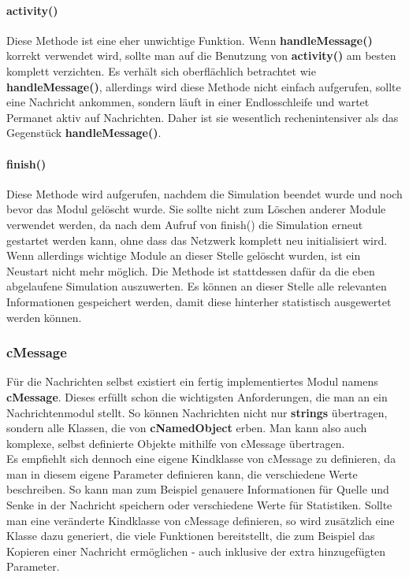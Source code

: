 \paragraph{activity()}

Diese Methode ist eine eher unwichtige Funktion. Wenn \textbf{handleMessage()} korrekt verwendet wird, sollte man auf die Benutzung von \textbf{activity()} am besten komplett verzichten. Es verhält sich oberflächlich betrachtet wie \textbf{handleMessage()}, allerdings wird diese Methode nicht einfach aufgerufen, sollte eine Nachricht ankommen, sondern läuft in einer Endlosschleife und wartet Permanet aktiv auf Nachrichten. Daher ist sie wesentlich rechenintensiver als das Gegenstück \textbf{handleMessage()}.

\paragraph{finish()}

Diese Methode wird aufgerufen, nachdem die Simulation beendet wurde und noch bevor das Modul gelöscht wurde. Sie sollte nicht zum Löschen anderer Module verwendet werden, da nach dem Aufruf von finish() die Simulation erneut gestartet werden kann, ohne dass das Netzwerk komplett neu initialisiert wird. Wenn allerdings wichtige Module an dieser Stelle gelöscht wurden, ist ein Neustart nicht mehr möglich.\newline
Die Methode ist stattdessen dafür da die eben abgelaufene Simulation auszuwerten. Es können an dieser Stelle alle relevanten Informationen gespeichert werden, damit diese hinterher statistisch ausgewertet werden können.

\subsubsection{cMessage}

Für die Nachrichten selbst existiert ein fertig implementiertes Modul namens \textbf{cMessage}. Dieses erfüllt schon die wichtigsten Anforderungen, die man an ein Nachrichtenmodul stellt. So können Nachrichten nicht nur \textbf{strings} übertragen, sondern alle Klassen, die von \textbf{cNamedObject} erben. Man kann also auch komplexe, selbst definierte Objekte mithilfe von cMessage übertragen.\\
Es empfiehlt sich dennoch eine eigene Kindklasse von cMessage zu definieren, da man in diesem eigene Parameter definieren kann, die verschiedene Werte beschreiben. So kann man zum Beispiel genauere Informationen für Quelle und Senke in der Nachricht speichern oder verschiedene Werte für Statistiken. Sollte man eine veränderte Kindklasse von cMessage definieren, so wird zusätzlich eine Klasse dazu generiert, die viele Funktionen bereitstellt, die zum Beispiel das Kopieren einer Nachricht ermöglichen - auch inklusive der extra hinzugefügten Parameter.

